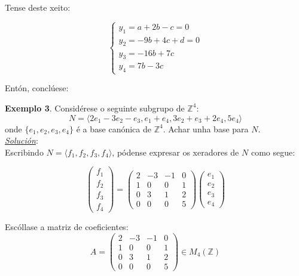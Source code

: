 \documentclass[twoside]{report}
\theoremstyle{mystyle}
\begin{document}
\vspace{3mm}

\noindent Tense deste xeito:

$$
\begin{cases}
y_{1} = a + 2b -c = 0\\
y_{2} = -9b + 4c + d = 0\\
y_{3} = -16b + 7c\\
y_{4} = 7b -3c
\end{cases}
$$

\vspace{3mm}

\noindent Entón, conclúese:

\begin{center}
\end{center}

\pagebreak

\noindent \textbf{Exemplo 3}. Considérese o seguinte subgrupo de $\mathbb{Z}^{4}:$
$$N = \langle 2e_{1} - 3e_{2} - e_{3}, e_{1} + e_{4}, 3e_{2} + e_{3} + 2e_{4}, 5e_{4} \rangle$$
\noindent onde $\{e_{1},e_{2},e_{3},e_{4}\}$ é a base canónica de $\mathbb{Z}^{4}$. Achar unha base para $N$.\\

\noindent \textit{\underline{Solución}}:\\

\noindent Escribindo $N = \langle f_{1}, f_{2}, f_{3}, f_{4} \rangle$, pódense expresar os xeradores de $N$ como segue:

\[
\begin{pmatrix}
f_{1}\\
f_{2}\\
f_{3}\\
f_{4}
\end{pmatrix}
=
\begin{pmatrix}
2 & -3 & -1 & 0\\
1 & 0 & 0 & 1\\
0 & 3 & 1 & 2\\
0 & 0 & 0 & 5
\end{pmatrix}
\begin{pmatrix}
e_{1}\\
e_{2}\\
e_{3}\\
e_{4}
\end{pmatrix}
\]

\vspace{3mm}

\noindent Escóllase a matriz de coeficientes:
\[
A =
\begin{pmatrix}
2 & -3 & -1 & 0\\
1 & 0 & 0 & 1\\
0 & 3 & 1 & 2\\
0 & 0 & 0 & 5
\end{pmatrix}
\in M_{4}(\mathbb{Z})
\]
\end{document}
